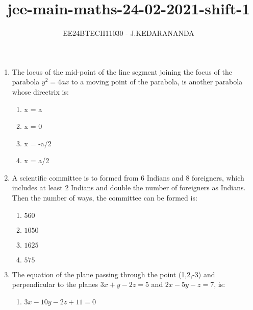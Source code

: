 \documentclass[journal]{IEEEtran}
\renewcommand{\thefigure}{\theenumi}
\renewcommand{\thetable}{\theenumi}
\numberwithin{equation}{enumi}
\numberwithin{figure}{enumi}
\renewcommand{\thetable}{\theenumi}
\begin{document}

\vspace{3cm}

\title{jee-main-maths-24-02-2021-shift-1}
\author{EE24BTECH11030 - J.KEDARANANDA}
{\let\newpage\relax\maketitle}
\renewcommand{\thefigure}{\theenumi}
\renewcommand{\thetable}{\theenumi}
\begin{enumerate}
    \item The locus of the mid-point of the line segment joining the focus of the parabola $y^2 = 4ax$ to a moving point of the parabola, is another parabola whose directrix is: \\ 
    \begin{multicols}{4}
    \begin{enumerate}
        \item x = a
        \item x = 0
        \item x = -a/2
        \item x = a/2
    \end{enumerate}
    \end{multicols}
    \item A scientific committee is to formed from 6 Indians and 8 foreigners, which includes at least 2 Indians and double the number of foreigners as Indians. Then the number of ways, the committee can be formed is: \\
    \begin{multicols}{4}
    \begin{enumerate}
        \item $560$
        \item $1050$
        \item $1625$
        \item $575$
    \end{enumerate}
    \end{multicols}
    \item The equation of the plane passing through the point (1,2,-3) and perpendicular to the planes $3x + y - 2z = 5$ and $2x - 5y - z = 7$, is: \\
    \begin{enumerate}
        \item $3x - 10y - 2z + 11 = 0$ 

\end{enumerate}
\end{enumerate}
\end{document}
